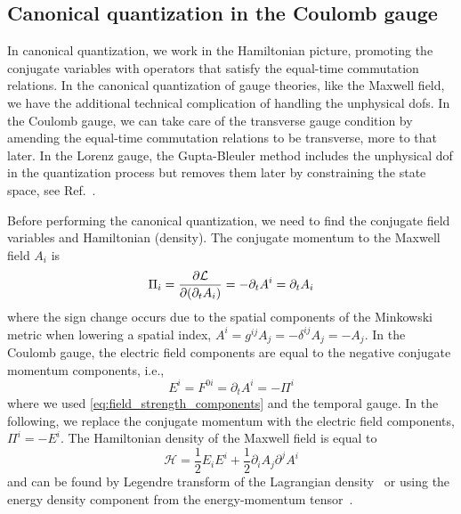 \subsection{Canonical quantization in the Coulomb gauge}

In canonical quantization, we work in the Hamiltonian picture, promoting the conjugate variables with operators that satisfy the equal-time commutation relations.
In the canonical quantization of gauge theories, like the Maxwell field, we have the additional technical complication of handling the unphysical \gls{dof}s.
In the Coulomb gauge, we can take care of the transverse gauge condition by amending the equal-time commutation relations to be transverse, more to that later.
In the Lorenz gauge, the Gupta-Bleuler method includes the unphysical \gls{dof} in the quantization process but removes them later by constraining the state space, see Ref.~\cite[p.~180]{Greiner2013}.

Before performing the canonical quantization, we need to find the conjugate field variables and Hamiltonian (density).
The conjugate momentum to the Maxwell field $A_i$ is~\cite[p.~342]{Srednicki2007}
\begin{equation}
	\Pi_i
	=
	\pdv{\mathcal{L}}{(\partial_t A_i)}
	=
	-
	\partial_t A^i
	=
	\partial_t A_i
	\label{eq:maxwell_conjugate_momentum}
\end{equation}
where the sign change occurs due to the spatial components of the Minkowski metric when lowering a spatial index, $A^i=g^{ij}A_j=-\delta^{ij}A_j=-A_j$.
In the Coulomb gauge, the electric field components are equal to the negative conjugate momentum components, i.e.,
\begin{equation}
	E^i
	=
	F^{0i}
	=
	\partial_t A^i
	=
	-
	\Pi^i
\end{equation}
where we used \cref{eq:field_strength_components} and the temporal gauge.
In the following, we replace the conjugate momentum with the electric field components, $\Pi^i=-E^i$.
The Hamiltonian density of the Maxwell field is equal to
\begin{equation}
	\mathcal{H}
	=
	\frac{1}{2}
	E_i E^i
	+
	\frac{1}{2}
	\partial_i A_j
	\partial^j A^i
	\label{eq:maxwell_hamiltonian}
\end{equation}
and can be found by Legendre transform of the Lagrangian density~\cite[p.~342]{Srednicki2007} or using the energy density component from the energy-momentum tensor~\cite[p.~148]{Greiner2013}.

